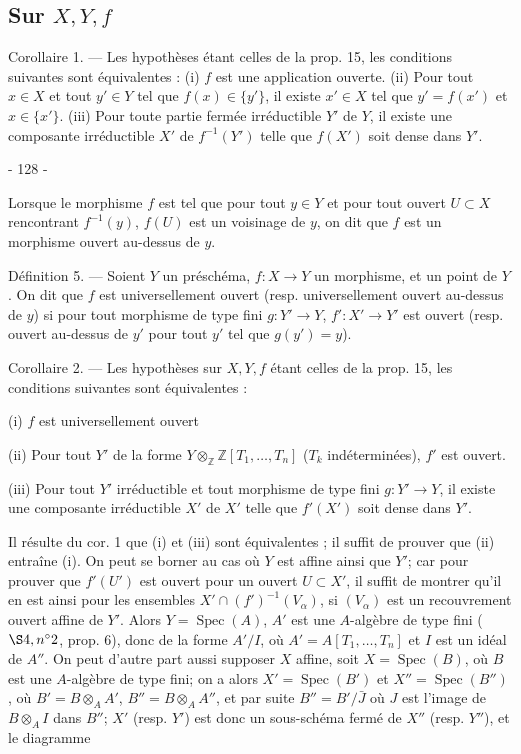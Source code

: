 \subsection*{Sur $X, Y, f$}
Corollaire 1. — Les hypothèses étant celles de la prop. 15, les conditions suivantes sont équivalentes :
(i) $f$ est une application ouverte.
(ii) Pour tout $x \in X$ et tout $y' \in Y$ tel que $f(x) \in \{y'\}$, il existe $x' \in X$ tel que $y' = f(x')$ et $x \in \{x'\}$.
(iii) Pour toute partie fermée irréductible $Y'$ de $Y$, il existe une composante irréductible $X'$ de $f^{-1}(Y')$ telle que $f(X')$ soit dense dans $Y'$.

\newpage


- 128 -

Lorsque le morphisme $f$ est tel que pour tout $y \in Y$ et pour tout ouvert $U \subset X$ rencontrant $f^{-1}(y)$, $f(U)$ est un voisinage de $y$, on dit que $f$ est un morphisme ouvert au-dessus de $y$.

Définition 5. — Soient $Y$ un préschéma, $f : X \to Y$ un morphisme, et un point de $Y$. On dit que $f$ est universellement ouvert (resp. universellement ouvert au-dessus de $y$) si pour tout morphisme de type fini $g : Y' \to Y$, $f' : X' \to Y'$ est ouvert (resp. ouvert au-dessus de $y'$ pour tout $y'$ tel que $g(y')=y$).

Corollaire 2. — Les hypothèses sur $X, Y, f$ étant celles de la prop. 15, les conditions suivantes sont équivalentes :

(i) $f$ est universellement ouvert

(ii) Pour tout $Y'$ de la forme $Y \otimes_{\mathbb{Z}} \mathbb{Z}[T_1, \dots, T_n]$ ($T_k$ indéterminées), $f'$ est ouvert.

(iii) Pour tout $Y'$ irréductible et tout morphisme de type fini $g : Y' \to Y$, il existe une composante irréductible $X'$ de $X'$ telle que $f'(X')$ soit dense dans $Y'$.


Il résulte du cor. 1 que (i) et (iii) sont équivalentes ; il suffit de prouver que (ii) entraîne (i). On peut se borner au cas où $Y$ est affine ainsi que $Y'$; car pour prouver que $f'(U')$ est ouvert pour un ouvert $U \subset X'$, il suffit de montrer qu'il en est ainsi pour les ensembles $X' \cap (f')^{-1}(V_{\alpha})$, si $(V_{\alpha})$ est un recouvrement ouvert affine de $Y'$. Alors $Y=\operatorname{Spec}(A)$, $A'$ est une $A$-algèbre de type fini ($\S 4, n^{\circ}2$, prop. 6), donc de la forme $A'/I$, où $A'=A[T_1, \dots, T_n]$ et $I$ est un idéal de $A''$. On peut d'autre part aussi supposer $X$ affine, soit $X=\operatorname{Spec}(B)$, où $B$ est une $A$-algèbre de type fini; on a alors $X'=\operatorname{Spec}(B')$ et $X''=\operatorname{Spec}(B'')$, où $B'=B \otimes_A A'$, $B''=B \otimes_A A''$, et par suite $B''=B'/\bar{J}$ où $J$ est l'image de $B \otimes_A I$ dans $B''$; $X'$ (resp. $Y'$) est donc un sous-schéma fermé de $X''$ (resp. $Y''$), et le diagramme

